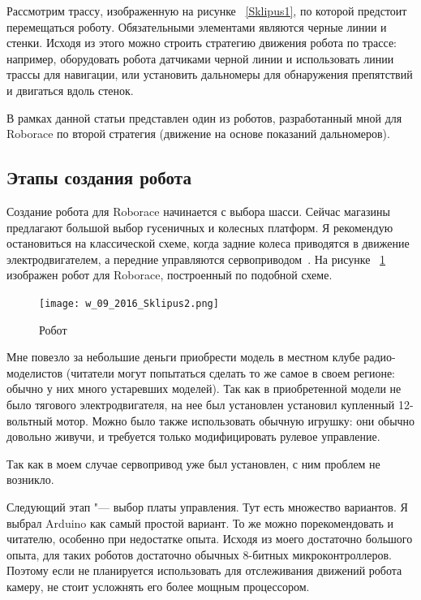 \documentclass[10pt, a5paper]{article}
\begin{document}
Рассмотрим трассу, изображенную на рисунке ~\ref{Sklipus1}, по которой предстоит перемещаться роботу. Обязательными элементами являются черные линии и стенки. Исходя из этого можно строить стратегию движения робота по трассе: например, оборудовать робота датчиками черной линии и использовать линии трассы для навигации, или установить дальномеры для обнаружения препятствий и двигаться вдоль стенок.

В рамках данной статьи представлен один из роботов, разработанный мной для Roborace по второй стратегия (движение на основе показаний дальномеров).

\subsection*{Этапы создания робота}

Создание робота для Roborace начинается с выбора шасси. Сейчас магазины предлагают большой выбор гусеничных и колесных платформ. Я рекомендую остановиться на классической схеме, когда задние колеса приводятся в движение электродвигателем, а передние управляются сервоприводом~\cite{Sklipus1}. На рисунке ~\ref{Sklipus2} изображен робот для Roborace, построенный по подобной схеме.

\begin{figure}[h!]
  \centering
  \texttt{[image: w\_09\_2016\_Sklipus2.png]}
  \caption {Робот}\label{Sklipus2}
\end{figure}

Мне повезло за небольшие деньги приобрести модель в местном клубе радио-моделистов (читатели могут попытаться сделать то же самое в своем регионе: обычно у них много устаревших моделей). Так как в приобретенной модели не было тягового электродвигателя, на нее был установлен установил купленный 12-вольтный мотор. Можно было также использовать обычную игрушку: они обычно довольно живучи, и требуется только модифицировать рулевое управление.

Так как в моем случае сервопривод уже был установлен, с ним проблем не возникло.

Следующий этап "--- выбор платы управления. Тут есть множество вариантов. Я выбрал Arduino как самый простой вариант. То же можно порекомендовать и читателю, особенно при недостатке опыта. Исходя из моего достаточно большого опыта, для таких роботов достаточно обычных 8-битных микроконтроллеров. Поэтому если не планируется использовать для отслеживания движений робота камеру, не стоит усложнять его более мощным процессором.
\end{document}
